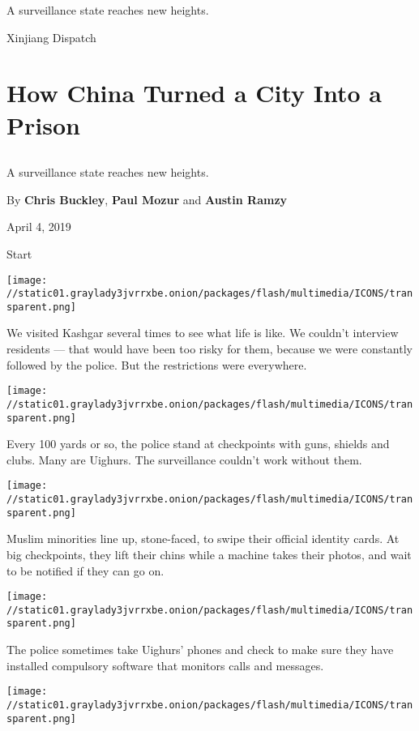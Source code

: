 A surveillance state reaches new heights.

Xinjiang Dispatch

\hypertarget{how-china-turned-a-city-into-a-prison-1}{%
\section{How China Turned a City Into a
Prison}\label{how-china-turned-a-city-into-a-prison-1}}

\hypertarget{section}{%
\subsection{}\label{section}}

A surveillance state reaches new heights.

By \textbf{Chris Buckley}, \textbf{Paul Mozur} and \textbf{Austin Ramzy}

April 4, 2019

Start

\texttt{[image: //static01.graylady3jvrrxbe.onion/packages/flash/multimedia/ICONS/transparent.png]}

We visited Kashgar several times to see what life is like. We couldn't
interview residents --- that would have been too risky for them, because
we were constantly followed by the police. But the restrictions were
everywhere.

\texttt{[image: //static01.graylady3jvrrxbe.onion/packages/flash/multimedia/ICONS/transparent.png]}

Every 100 yards or so, the police stand at checkpoints with guns,
shields and clubs. Many are Uighurs. The surveillance couldn't work
without them.

\texttt{[image: //static01.graylady3jvrrxbe.onion/packages/flash/multimedia/ICONS/transparent.png]}

Muslim minorities line up, stone-faced, to swipe their official identity
cards. At big checkpoints, they lift their chins while a machine takes
their photos, and wait to be notified if they can go on.

\texttt{[image: //static01.graylady3jvrrxbe.onion/packages/flash/multimedia/ICONS/transparent.png]}

The police sometimes take Uighurs' phones and check to make sure they
have installed compulsory software that monitors calls and messages.

\texttt{[image: //static01.graylady3jvrrxbe.onion/packages/flash/multimedia/ICONS/transparent.png]}

